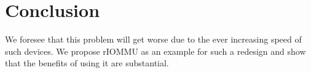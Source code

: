 \section{Conclusion} \label{sec:con}
We foresee that this problem will get worse due to the ever increasing speed of such devices.
We propose rIOMMU as an example for such a redesign and show that the benefits of using it are substantial.